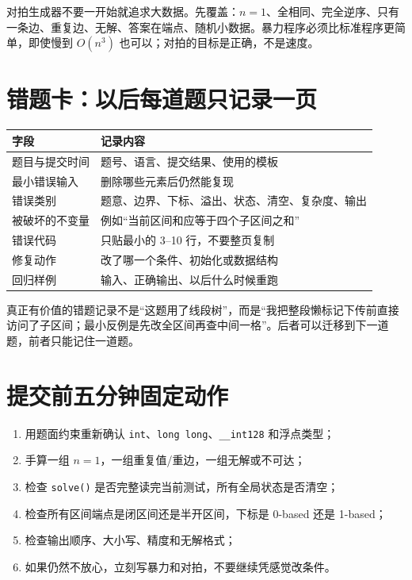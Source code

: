 \documentclass[UTF8,openany,oneside,zihao=-4]{ctexbook}
\begin{document}
对拍生成器不要一开始就追求大数据。先覆盖：$n=1$、全相同、完全逆序、只有一条边、重复边、无解、答案在端点、随机小数据。暴力程序必须比标准程序更简单，即使慢到 $O(n^3)$ 也可以；对拍的目标是正确，不是速度。

\section{错题卡：以后每道题只记录一页}

\begin{center}
\begin{tabular}{p{}p{}}
\hline
字段 & 记录内容 \tabularnewline
\hline
题目与提交时间 & 题号、语言、提交结果、使用的模板 \tabularnewline
最小错误输入 & 删除哪些元素后仍然能复现 \tabularnewline
错误类别 & 题意、边界、下标、溢出、状态、清空、复杂度、输出 \tabularnewline
被破坏的不变量 & 例如“当前区间和应等于四个子区间之和” \tabularnewline
错误代码 & 只贴最小的 3--10 行，不要整页复制 \tabularnewline
修复动作 & 改了哪一个条件、初始化或数据结构 \tabularnewline
回归样例 & 输入、正确输出、以后什么时候重跑 \tabularnewline
\hline
\end{tabular}
\end{center}

\begin{tip}
真正有价值的错题记录不是“这题用了线段树”，而是“我把整段懒标记下传前直接访问了子区间；最小反例是先改全区间再查中间一格”。后者可以迁移到下一道题，前者只能记住一道题。
\end{tip}

\section{提交前五分钟固定动作}

\begin{enumerate}
  \item 用题面约束重新确认 \lstinline|int|、\lstinline|long long|、\lstinline|__int128| 和浮点类型；
  \item 手算一组 $n=1$，一组重复值/重边，一组无解或不可达；
  \item 检查 \lstinline|solve()| 是否完整读完当前测试，所有全局状态是否清空；
  \item 检查所有区间端点是闭区间还是半开区间，下标是 0-based 还是 1-based；
  \item 检查输出顺序、大小写、精度和无解格式；
  \item 如果仍然不放心，立刻写暴力和对拍，不要继续凭感觉改条件。
\end{enumerate}
\end{document}
